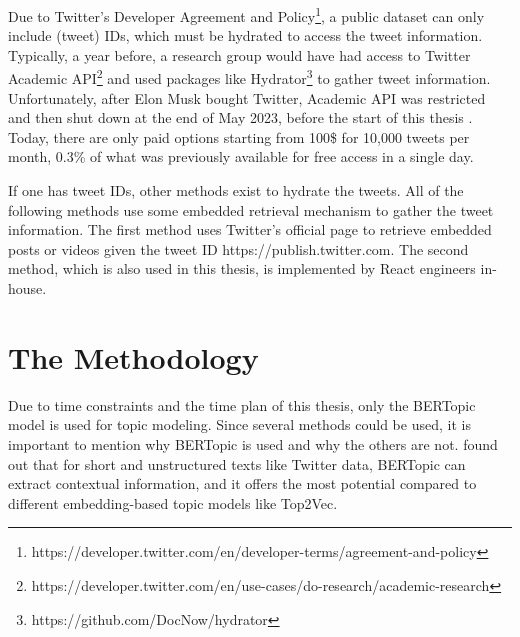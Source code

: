 Due to Twitter's Developer Agreement and Policy\footnote{https://developer.twitter.com/en/developer-terms/agreement-and-policy}, 
a public dataset can only include (tweet) IDs, which must be hydrated to access the 
tweet information. Typically, a year before, a research group would have had access 
to Twitter Academic API\footnote{https://developer.twitter.com/en/use-cases/do-research/academic-research} 
and used packages like Hydrator\footnote{https://github.com/DocNow/hydrator} to gather 
tweet information. Unfortunately, after Elon Musk bought Twitter, Academic API was 
restricted and then shut down at the end of May 2023, before the start of this 
thesis \parencite{calma_twitter_academicAPI_elon_2023}. Today, there are only paid 
options starting from 100\$ for 10,000 tweets per month, 0.3\% of what was previously 
available for free access in a single day. 

If one has tweet IDs, other methods exist to hydrate the tweets. 
All of the following methods use some embedded retrieval mechanism to gather 
the tweet information. The first method uses Twitter's official page to 
retrieve embedded posts or videos given the tweet ID\: https://publish.twitter.com. 
The second method, which is also used in this thesis, is implemented by React engineers in-house.

\section{The Methodology}

Due to time constraints and the time plan of this thesis, only the BERTopic model 
is used for topic modeling. Since several methods could be used, it is important 
to mention why BERTopic is used and why the others are not.
\textcite{topic_model_comparison_bertopic_2022} found out that for short and 
unstructured texts like Twitter data, BERTopic can extract contextual information, 
and it offers the most potential compared to different embedding-based topic models like Top2Vec.

